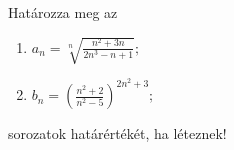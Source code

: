 \documentclass[11pt]{scrartcl}
\begin{document}
Határozza meg az
\begin{enumerate}
	\item \(\displaystyle
	      a_n = \sqrt[n]{\frac{n^2 + 3n}{2n^3 - n + 1}};
	      \)

	\item \(\displaystyle
	      b_n = \left(
	      \frac{n^2 + 2}{n^2 - 5}
	      \right)^{2n^2 + 3};
	      \)
\end{enumerate}
sorozatok határértékét, ha léteznek!
\end{document}
